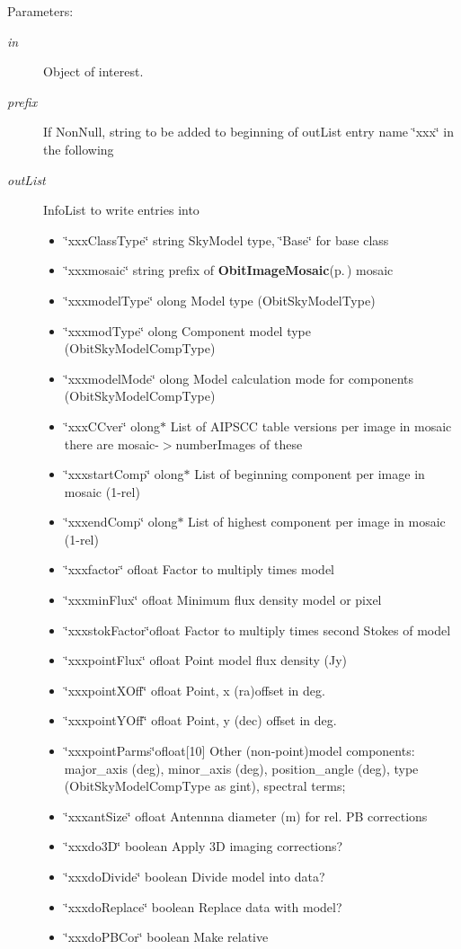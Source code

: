 \begin{Desc}
\item[Parameters:]
\begin{description}
\item[{\em in}]Object of interest. \item[{\em prefix}]If Non\-Null, string to be added to beginning of out\-List entry name \char`\"{}xxx\char`\"{} in the following \item[{\em out\-List}]Info\-List to write entries into \begin{itemize}
\item \char`\"{}xxx\-Class\-Type\char`\"{} string Sky\-Model type, \char`\"{}Base\char`\"{} for base class \item \char`\"{}xxxmosaic\char`\"{} string prefix of {\bf Obit\-Image\-Mosaic}{\rm (p.\,\pageref{structObitImageMosaic})} mosaic \item \char`\"{}xxxmodel\-Type\char`\"{} olong Model type (Obit\-Sky\-Model\-Type) \item \char`\"{}xxxmod\-Type\char`\"{} olong Component model type (Obit\-Sky\-Model\-Comp\-Type) \item \char`\"{}xxxmodel\-Mode\char`\"{} olong Model calculation mode for components (Obit\-Sky\-Model\-Comp\-Type) \item \char`\"{}xxx\-CCver\char`\"{} olong$\ast$ List of AIPSCC table versions per image in mosaic there are mosaic-$>$number\-Images of these \item \char`\"{}xxxstart\-Comp\char`\"{} olong$\ast$ List of beginning component per image in mosaic (1-rel) \item \char`\"{}xxxend\-Comp\char`\"{} olong$\ast$ List of highest component per image in mosaic (1-rel) \item \char`\"{}xxxfactor\char`\"{} ofloat Factor to multiply times model \item \char`\"{}xxxmin\-Flux\char`\"{} ofloat Minimum flux density model or pixel \item \char`\"{}xxxstok\-Factor\char`\"{}ofloat Factor to multiply times second Stokes of model \item \char`\"{}xxxpoint\-Flux\char`\"{} ofloat Point model flux density (Jy) \item \char`\"{}xxxpoint\-XOff\char`\"{} ofloat Point, x (ra)offset in deg. \item \char`\"{}xxxpoint\-YOff\char`\"{} ofloat Point, y (dec) offset in deg. \item \char`\"{}xxxpoint\-Parms\char`\"{}ofloat[10] Other (non-point)model components: major\_\-axis (deg), minor\_\-axis (deg), position\_\-angle (deg), type (Obit\-Sky\-Model\-Comp\-Type as gint), spectral terms; \item \char`\"{}xxxant\-Size\char`\"{} ofloat Antennna diameter (m) for rel. PB corrections \item \char`\"{}xxxdo3D\char`\"{} boolean Apply 3D imaging corrections? \item \char`\"{}xxxdo\-Divide\char`\"{} boolean Divide model into data? \item \char`\"{}xxxdo\-Replace\char`\"{} boolean Replace data with model? \item \char`\"{}xxxdo\-PBCor\char`\"{} boolean Make relative 
\end{itemize}
\end{description}
\end{Desc}
